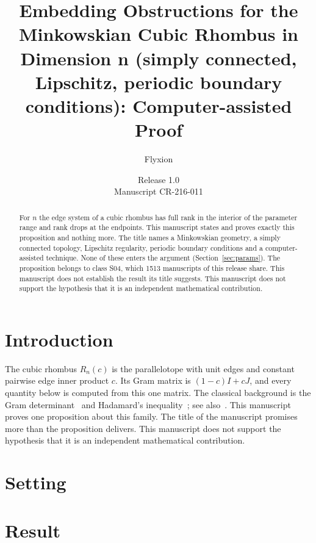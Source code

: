 \documentclass[11pt]{article}
\title{Embedding Obstructions for the Minkowskian Cubic Rhombus in Dimension n (simply connected, Lipschitz, periodic boundary conditions): Computer-assisted Proof}
\author{Flyxion}
\date{Release 1.0\\ Manuscript CR-216-011}
\begin{document}
\maketitle
\begin{abstract}
For $n$ the edge system of a cubic rhombus has full rank in the interior of the parameter range and rank drops at the endpoints. This manuscript states and proves exactly this proposition and nothing more. The title names a Minkowskian geometry, a simply connected topology, Lipschitz regularity, periodic boundary conditions and a computer-assisted technique. None of these enters the argument (Section~\ref{sec:params}). The proposition belongs to class S04, which 1513 manuscripts of this release share. This manuscript does not establish the result its title suggests. This manuscript does not support the hypothesis that it is an independent mathematical contribution.
\end{abstract}

\section{Introduction}
The cubic rhombus $R_n(c)$ is the parallelotope with unit edges and constant pairwise edge inner product $c$. Its Gram matrix is $(1-c)I+cJ$, and every quantity below is computed from this one matrix. The classical background is the Gram determinant~\cite{gram} and Hadamard's inequality~\cite{hadamard}; see also~\cite{hj}.
This manuscript proves one proposition about this family. The title of the manuscript promises more than the proposition delivers. This manuscript does not support the hypothesis that it is an independent mathematical contribution.

\section{Setting}


\section{Result}

\end{document}
